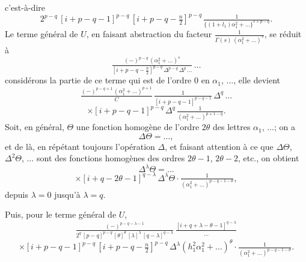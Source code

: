 \documentclass[12pt,a4paper]{article}
\begin{document}
\newpage
\setcounter{page}{200}

c'est-\`a-dire
\[
2^{p - q}\,[i + p - q - 1]^{p - q}\,[i + p - q - \tfrac{n}{2}]^{p - q}\,\tfrac{1}{\{(1 + l_1)\alpha_1^2 + \ldots\}^{s + p - q}}.
\]
Le terme g\'en\'eral de $U$, en faisant abstraction du facteur $\tfrac{1}{\Gamma(s)\,(\alpha_1^2 + \ldots)^s}$, se r\'eduit \`a
\[
\tfrac{(-)^{p - q}\,(\alpha_1^2 + \ldots)^{s}}{[i + p - q - \tfrac{n}{2}]^{p - q}\,\Delta^{p - q}\,\Delta^q\,\ldots}\,\ldots
\]
consid\'erons la partie de ce terme qui est de l'ordre $0$ en $\alpha_1$, $\ldots$, elle devient
\[
\tfrac{(-)^{p - q + 1}\,(\alpha_1^2 + \ldots)^{p + 1}}{C}\,\tfrac{1}{[i + p - q - 1]^{p - q - 1}}\,\Delta^q\,\ldots
\]
\[
\times [i + p - q - 1]^{p - q}\,\Delta^q\,\tfrac{1}{(\alpha_1^2 + \ldots)^{p + 1 - q}}.
\]
Soit, en g\'en\'eral, $\Theta$ une fonction homog\`ene de l'ordre $2\theta$ des lettres $\alpha_1$, $\ldots$; on a
\[
\Delta\Theta = \ldots,
\]
et de l\`a, en r\'ep\'etant toujours l'op\'eration $\Delta$, et faisant attention \`a ce que $\Delta\Theta$, $\Delta^2\Theta$, $\ldots$ sont des fonctions homog\`enes des ordres $2\theta - 1$, $2\theta - 2$, etc., on obtient
\[
\Delta^{\lambda}\Theta = \ldots
\]
\[
\times [i + q - 2\theta - 1]^{q - \lambda}\,\Delta^{\lambda}\Theta \cdot \tfrac{1}{(\alpha_1^2 + \ldots)^{p - q - 1 - \theta}},
\]
depuis $\lambda = 0$ jusqu'\`a $\lambda = q$.

Puis, pour le terme g\'en\'eral de $U$,
\[
\tfrac{(-)^{p - q - \lambda - 1}}{2^q\,[p - q]^{p - q}\,[\theta]^{\theta}\,[\lambda]^{\lambda}\,[q - \lambda]^{q - \lambda}}\,\tfrac{[i + q + \lambda - \theta - 1]^{q - \lambda}}{\ldots}
\]
\[
\times [i + p - q - 1]^{p - q}\,[i + p - q - \tfrac{n}{2}]^{p - q}\,\Delta^{\lambda}(h_1^2\alpha_1^2 + \ldots)^{\theta} \cdot \tfrac{1}{(\alpha_1^2 + \ldots)^{p - q - 1 - \theta}}.
\]

\newpage
\setcounter{page}{201}
\end{document}
